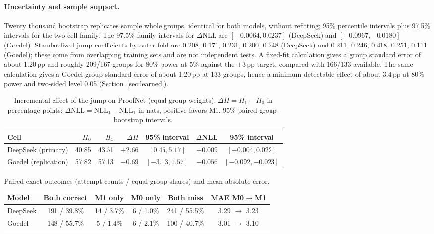 \paragraph{Uncertainty and sample support.} Twenty thousand bootstrap replicates sample whole groups, identical for both models, without refitting; 95\% percentile intervals plus 97.5\% intervals for the two-cell family. The 97.5\% family intervals for $\Delta$NLL are $[-0.0064, 0.0237]$ (DeepSeek) and $[-0.0967, -0.0180]$ (Goedel). Standardized jump coefficients by outer fold are 0.208, 0.171, 0.231, 0.200, 0.248 (DeepSeek) and 0.211, 0.246, 0.418, 0.251, 0.111 (Goedel); these come from overlapping training sets and are not independent tests. A fixed-fit calculation gives a group standard error of about 1.20\,pp and roughly 209/167 groups for 80\% power at 5\% against the +3\,pp target, compared with 166/133 available. The same calculation gives a Goedel group standard error of about 1.20\,pp at 133 groups, hence a minimum detectable effect of about 3.4\,pp at 80\% power and two-sided level 0.05 (Section~\ref{sec:learned}).

\begin{table}[h]
\caption{Incremental effect of the jump on ProofNet (equal group weights). $\Delta H=H_1-H_0$ in percentage points; $\Delta\mathrm{NLL}=\mathrm{NLL}_0-\mathrm{NLL}_1$ in nats, positive favors M1. 95\% paired group-bootstrap intervals.}
\label{tab:incremental}
\begin{center}
\small
\setlength{\tabcolsep}{4pt}
\begin{tabular}{lrrrcrc}
\toprule
Cell & $H_0$ & $H_1$ & $\Delta H$ & 95\% interval & $\Delta$NLL & 95\% interval\\
\midrule
DeepSeek (primary) & 40.85 & 43.51 & $+2.66$ & $[0.45, 5.17]$ & $+0.009$ & $[-0.004, 0.022]$\\
Goedel (replication) & 57.82 & 57.13 & $-0.69$ & $[-3.13, 1.57]$ & $-0.056$ & $[-0.092, -0.023]$\\
\bottomrule
\end{tabular}
\end{center}
\end{table}

\begin{table}[h]
\caption{Paired exact outcomes (attempt counts / equal-group shares) and mean absolute error.}
\label{tab:paired}
\begin{center}
\small
\begin{tabular}{lccccc}
\toprule
Model & Both correct & M1 only & M0 only & Both miss & MAE M0$\to$M1\\
\midrule
DeepSeek & 191 / 39.8\% & 14 / 3.7\% & 6 / 1.0\% & 241 / 55.5\% & 3.29 $\to$ 3.23\\
Goedel & 148 / 55.7\% & 5 / 1.4\% & 6 / 2.1\% & 100 / 40.7\% & 3.01 $\to$ 3.10\\
\bottomrule
\end{tabular}
\end{center}
\end{table}

